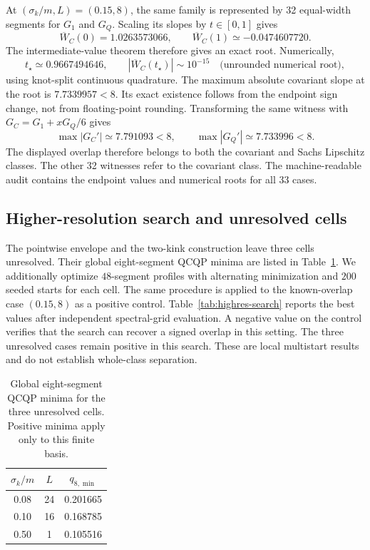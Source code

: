 \documentclass[12pt]{iopjournal}
\newenvironment{ruledtabular}{\centering}{}
\newcommand{\colrule}{\hline}
\begin{document}
At $(\sigma_k/m,L)=(0.15,8)$, the same family is represented by 32 equal-width segments for $G_1$ and $G_Q$. Scaling its slopes by $t\in[0,1]$ gives
\begin{equation}
\overline W_C(0)=1.0263573066,
\qquad
\overline W_C(1)\simeq-0.0474607720.
\end{equation}
The intermediate-value theorem therefore gives an exact root. Numerically,
\begin{equation}
t_\star\simeq0.9667494646,
\qquad
|\overline W_C(t_\star)|\sim10^{-15}\quad\text{(unrounded numerical root)},
\end{equation}
using knot-split continuous quadrature. The maximum absolute covariant slope at the root is $7.7339957<8$. Its exact existence follows from the endpoint sign change, not from floating-point rounding. Transforming the same witness with $G_C=G_1+xG_Q/6$ gives
\begin{equation}
\max|G_C'|\simeq7.791093<8,
\qquad
\max|G_Q'|\simeq7.733996<8.
\end{equation}
The displayed overlap therefore belongs to both the covariant and Sachs Lipschitz classes. The other 32 witnesses refer to the covariant class. The machine-readable audit contains the endpoint values and numerical roots for all 33 cases.

\subsection{Higher-resolution search and unresolved cells}

The pointwise envelope and the two-kink construction leave three cells unresolved. Their global eight-segment QCQP minima are listed in Table~\ref{tab:unresolved-searches}. We additionally optimize $48$-segment profiles with alternating minimization and $200$ seeded starts for each cell. The same procedure is applied to the known-overlap case $(0.15,8)$ as a positive control. Table~\ref{tab:highres-search} reports the best values after independent spectral-grid evaluation. A negative value on the control verifies that the search can recover a signed overlap in this setting. The three unresolved cases remain positive in this search. These are local multistart results and do not establish whole-class separation.

\begin{table}[ht]
\caption{Global eight-segment QCQP minima for the three unresolved cells. Positive minima apply only to this finite basis.}
\label{tab:unresolved-searches}
\begin{ruledtabular}
\begin{tabular}{ccc}
$\sigma_k/m$ & $L$ & $q_{8,\min}$ \\
\colrule
0.08 & 24 & 0.201665 \\
0.10 & 16 & 0.168785 \\
0.50 & 1 & 0.105516 \\
\end{tabular}
\end{ruledtabular}
\end{table}
\end{document}
